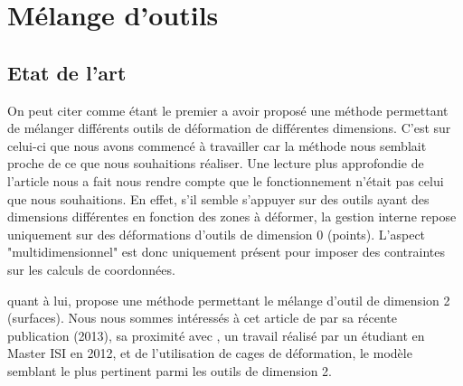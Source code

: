 
\chapter{Mélange d'outils}

\graphicspath{{Chapter2/Chapter2Figs/PNG/}{Chapter2/Chapter2Figs/PDF/}{Chapter2/Chapter2Figs/}}

    \section{Etat de l'art}
    On peut citer \cite{JBPS11} comme étant le premier a avoir proposé
    une méthode permettant de mélanger différents outils de
    déformation de différentes dimensions.  C'est sur celui-ci que
    nous avons commencé à travailler car la méthode nous semblait
    proche de ce que nous souhaitions réaliser. Une lecture plus
    approfondie de l'article nous a fait nous rendre compte que le
    fonctionnement n'était pas celui que nous souhaitions.  En effet,
    s'il semble s'appuyer sur des outils ayant des dimensions
    différentes en fonction des zones à déformer, la gestion interne
    repose uniquement sur des déformations d'outils de dimension 0
    (points).  L'aspect "multidimensionnel" est donc uniquement
    présent pour imposer des contraintes sur les calculs de
    coordonnées.

    \cite{GPCP13} quant à lui, propose une méthode permettant le
    mélange d'outil de dimension 2 (surfaces). Nous nous sommes
    intéressés à cet article de par sa récente publication (2013), sa
    proximité avec \cite{Hur12}, un travail réalisé par un étudiant en
    Master ISI en 2012, et de l'utilisation de cages de déformation,
    le modèle semblant le plus pertinent parmi les outils de dimension
    2.


